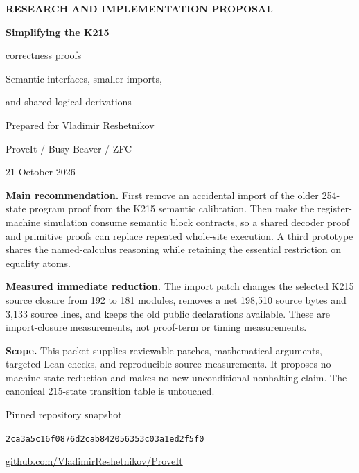 \documentclass[11pt,letterpaper]{article}
\newcommand{\RepoSHA}{2ca3a5c16f0876d2cab842056353c03a1ed2f5f0}
\newcommand{\RepoURL}{https://github.com/VladimirReshetnikov/ProveIt}
\theoremstyle{definition}\newtheorem{definition}[theorem]{Definition}
\begin{document}
\hypersetup{pageanchor=false}
\begin{titlepage}
\vspace*{0.6in}
{\color{teal}\sffamily\bfseries RESEARCH AND IMPLEMENTATION PROPOSAL\par}
\vspace{0.3in}
{\color{navy}\Huge\bfseries Simplifying the K215\par correctness proofs\par}
\vspace{0.25in}
{\Large Semantic interfaces, smaller imports,\par and shared logical derivations\par}
\vspace{0.4in}
{\large Prepared for Vladimir Reshetnikov\par ProveIt / Busy Beaver / ZFC\par}
\vspace{0.15in}
21 October 2026
\vfill
\begin{minipage}{0.94\textwidth}
\textbf{Main recommendation.} First remove an accidental import of the older
254-state program proof from the K215 semantic calibration. Then make the
register-machine simulation consume semantic block contracts, so a shared
decoder proof and primitive proofs can replace repeated whole-site execution.
A third prototype shares the named-calculus reasoning while retaining the
essential restriction on equality atoms.

\textbf{Measured immediate reduction.} The import patch changes the selected
K215 source closure from 192 to 181 modules, removes a net 198,510 source bytes
and 3,133 source lines, and keeps the old public declarations available.
These are import-closure measurements, not proof-term or timing measurements.

\textbf{Scope.} This packet supplies reviewable patches, mathematical arguments,
targeted Lean checks, and reproducible source measurements. It proposes no
machine-state reduction and makes no new unconditional nonhalting claim.
The canonical 215-state transition table is untouched.
\end{minipage}
\vfill
{\small\color{grayink}Pinned repository snapshot\par
\texttt{\RepoSHA}\par
\href{\RepoURL}{github.com/VladimirReshetnikov/ProveIt}}
\end{titlepage}
\hypersetup{pageanchor=true}
\setcounter{tocdepth}{1}
\tableofcontents
\clearpage{}
\end{document}
